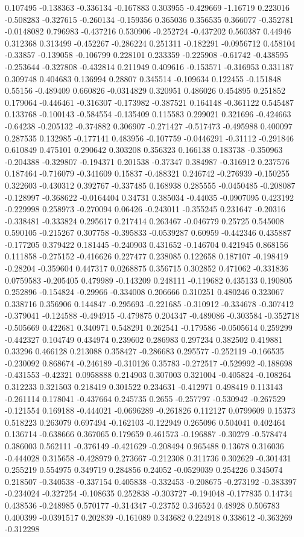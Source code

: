 0.107495 -0.138363 -0.336134 -0.167883 0.303955 -0.429669 -1.16719 0.223016 -0.508283 -0.327615 -0.260134 -0.159356 0.365036 0.356535 0.366077 -0.352781 -0.0148082 0.796983 -0.437216 0.530906 -0.252724 -0.437202 0.560387 0.44946 0.312368 0.313499 -0.452267 -0.286224 0.251311 -0.182291 -0.0956712 0.458104 -0.33857 -0.139058 -0.106799 0.228101 0.233359 -0.225908 -0.61742 -0.438595 -0.253644 -0.327808 -0.432814 0.211949 0.409616 -0.153571 -0.316953 0.331187 0.309748 0.404683 0.136994 0.28807 0.345514 -0.109634 0.122455 -0.151848 0.55156 -0.489409 0.660826 -0.0314829 0.320951 0.486026 0.454895 0.251852 0.179064 -0.446461 -0.316307 -0.173982 -0.387521 0.164148 -0.361122 0.545487 0.133768 -0.100143 -0.584554 -0.135409 0.115583 0.299021 0.321696 -0.424663 -0.64238 -0.205132 -0.374882 0.306907 -0.271427 -0.517473 -0.495988 0.400097 0.287535 0.132985 -0.177141 0.483956 -0.107759 -0.0446291 -0.31112 -0.291846 0.610849 0.475101 0.290642 0.303208 0.356323 0.166138 0.183738 -0.350963 -0.204388 -0.329807 -0.194371 0.201538 -0.37347 0.384987 -0.316912 0.237576 0.187464 -0.716079 -0.341609 0.15837 -0.488321 0.246742 -0.276939 -0.150255 0.322603 -0.430312 0.392767 -0.337485 0.168938 0.285555 -0.0450485 -0.208087 -0.128997 -0.368622 -0.0164404 0.34731 0.385034 -0.44035 -0.0907095 0.423192 -0.229998 0.258973 -0.270094 0.06426 -0.243011 -0.355245 0.231647 -0.20316 -0.338481 -0.333824 0.295617 0.217414 0.263467 -0.046779 0.25725 0.545008 0.590105 -0.215267 0.307758 -0.395833 -0.0539287 0.60959 -0.442346 0.435887 -0.177205 0.379422 0.181445 -0.240903 0.431652 -0.146704 0.421945 0.868156 0.111858 -0.275152 -0.416626 0.227477 0.238085 0.122658 0.187107 -0.198419 -0.28204 -0.359604 0.447317 0.0268875 0.356715 0.302852 0.471062 -0.331836 0.0759583 -0.205405 0.479989 -0.143209 0.248111 -0.119682 0.435133 0.190805 0.252896 -0.154824 -0.29966 -0.334008 0.206666 0.310251 0.480246 0.323067 0.338716 0.356906 0.144847 -0.295693 -0.221685 -0.310912 -0.334678 -0.307412 -0.379041 -0.124588 -0.494915 -0.479875 0.204347 -0.489086 -0.303584 -0.352718 -0.505669 0.422681 0.340971 0.548291 0.262541 -0.179586 -0.0505614 0.259299 -0.442327 0.104749 0.434974 0.239602 0.286983 0.297234 0.382502 0.419881 0.33296 0.466128 0.213088 0.358427 -0.286683 0.295577 -0.252119 -0.166535 -0.230092 0.868674 -0.246189 -0.310126 0.35783 -0.272517 -0.529992 -0.188698 -0.431553 -0.42321 0.0958888 0.214903 0.307003 0.321004 -0.405824 -0.108264 0.312233 0.321503 0.218419 0.301522 0.234631 -0.412971 0.498419 0.113143 -0.261114 0.178041 -0.437664 0.245735 0.2655 -0.257797 -0.530942 -0.267529 -0.121554 0.169188 -0.444021 -0.0696289 -0.261826 0.112127 0.0799609 0.15373 0.518223 0.263079 0.697494 -0.162103 -0.122949 0.265096 0.504041 0.402464 0.136714 -0.638666 0.367065 0.179659 0.461573 -0.196887 -0.30279 -0.578474 0.386003 0.562111 -0.376149 -0.421629 -0.208494 0.965488 0.13678 0.316036 -0.444028 0.315658 -0.428979 0.273667 -0.212308 0.311736 0.302629 -0.301431 0.255219 0.554975 0.349719 0.284856 0.24052 -0.0529039 0.254226 0.345074 0.218507 -0.340538 -0.337154 0.405838 -0.332453 -0.208675 -0.273192 -0.383397 -0.234024 -0.327254 -0.108635 0.252838 -0.303727 -0.194048 -0.177835 0.14734 0.438536 -0.248985 0.570177 -0.314347 -0.23752 0.346524 0.48928 0.506783 0.400399 -0.0391517 0.202839 -0.161089 0.343682 0.224918 0.338612 -0.363269 -0.312298 